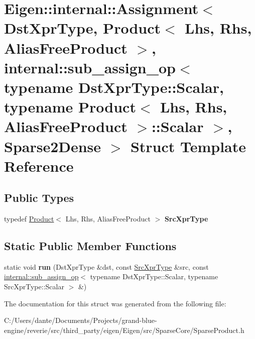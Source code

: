 \hypertarget{struct_eigen_1_1internal_1_1_assignment_3_01_dst_xpr_type_00_01_product_3_01_lhs_00_01_rhs_00_014697dd90e96dca324eed00088adc1a1c}{}\section{Eigen\+::internal\+::Assignment$<$ Dst\+Xpr\+Type, Product$<$ Lhs, Rhs, Alias\+Free\+Product $>$, internal\+::sub\+\_\+assign\+\_\+op$<$ typename Dst\+Xpr\+Type\+::Scalar, typename Product$<$ Lhs, Rhs, Alias\+Free\+Product $>$\+::Scalar $>$, Sparse2\+Dense $>$ Struct Template Reference}
\label{struct_eigen_1_1internal_1_1_assignment_3_01_dst_xpr_type_00_01_product_3_01_lhs_00_01_rhs_00_014697dd90e96dca324eed00088adc1a1c}
\subsection*{Public Types}
\begin{DoxyCompactItemize}
\item 
\mbox{\label{struct_eigen_1_1internal_1_1_assignment_3_01_dst_xpr_type_00_01_product_3_01_lhs_00_01_rhs_00_014697dd90e96dca324eed00088adc1a1c_ac283472d9605669723e1a05fab2cf5ee}} 
typedef \mbox{\hyperlink{class_eigen_1_1_product}{Product}}$<$ Lhs, Rhs, Alias\+Free\+Product $>$ {\bfseries Src\+Xpr\+Type}
\end{DoxyCompactItemize}
\subsection*{Static Public Member Functions}
\begin{DoxyCompactItemize}
\item 
\mbox{\label{struct_eigen_1_1internal_1_1_assignment_3_01_dst_xpr_type_00_01_product_3_01_lhs_00_01_rhs_00_014697dd90e96dca324eed00088adc1a1c_ad3dfa9d4dc1b79e20c0ef37b2d3f66fd}} 
static void {\bfseries run} (Dst\+Xpr\+Type \&dst, const \mbox{\hyperlink{class_eigen_1_1_product}{Src\+Xpr\+Type}} \&src, const \mbox{\hyperlink{struct_eigen_1_1internal_1_1sub__assign__op}{internal\+::sub\+\_\+assign\+\_\+op}}$<$ typename Dst\+Xpr\+Type\+::\+Scalar, typename Src\+Xpr\+Type\+::\+Scalar $>$ \&)
\end{DoxyCompactItemize}


The documentation for this struct was generated from the following file\+:\begin{DoxyCompactItemize}
\item 
C\+:/\+Users/dante/\+Documents/\+Projects/grand-\/blue-\/engine/reverie/src/third\+\_\+party/eigen/\+Eigen/src/\+Sparse\+Core/Sparse\+Product.\+h\end{DoxyCompactItemize}
